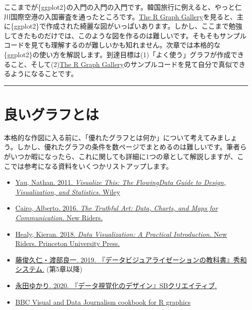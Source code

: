 \documentclass[
  a4paper,
  pandoc,
  ja=standard,
  jafont=haranoaji]{bxjsbook}
\providecommand{\tightlist}{%
  \setlength{\itemsep}{0pt}\setlength{\parskip}{0pt}}
\begin{document}
ここまでが\{ggplot2\}の入門の入門の入門です。韓国旅行に例えると、やっと仁川国際空港の入国審査を通ったところです。\href{https://www.r-graph-gallery.com/}{The
R Graph
Gallery}を見ると、主に\{ggplot2\}で作成された綺麗な図がいっぱいあります。しかし、ここまで勉強してきたものだけでは、このような図を作るのは難しいです。そもそもサンプルコードを見ても理解するのが難しいかも知れません。次章では本格的な\{ggplot2\}の使い方を解説します。到達目標は(1)「よく使う」グラフが作成できること、そして(2)\href{https://www.r-graph-gallery.com/}{The
R Graph
Gallery}のサンプルコードを見て自分で真似できるようになることです。

\begin{center}\rule{0.5\linewidth}{0.5pt}\end{center}

\hypertarget{sec-visual1_principal}{%
\section{良いグラフとは}\label{sec-visual1_principal}}

本格的な作図に入る前に、「優れたグラフとは何か」について考えてみましょう。しかし、優れたグラフの条件を数ページでまとめるのは難しいです。筆者らがいつか暇になったら、これに関しても詳細に1つの章として解説しますが、ここでは参考になる資料をいくつかリストアップします。

\begin{itemize}
\tightlist
\item
  \href{https://www.amazon.co.jp/dp/0470944889}{Yau, Nathan. 2011.
  \emph{Visualize This: The FlowingData Guide to Design, Visualization,
  and Statistics.} Wiley}
\item
  \href{https://www.amazon.co.jp/dp/0321934075}{Cairo, Alberto. 2016.
  \emph{The Truthful Art: Data, Charts, and Maps for Communication.} New
  Riders.}
\item
  \href{https://www.amazon.co.jp/dp/0691181624}{Healy, Kieran. 2018.
  \emph{Data Visualization: A Practical Introduction.} New Riders.
  Princeton University Press.}
\item
  \href{https://www.amazon.co.jp/dp/0691181624}{藤俊久仁・渡部良一.
  2019. 『データビジュアライゼーションの教科書』秀和システム.}
  (第5章以降)
\item
  \href{https://www.amazon.co.jp/dp/4815604053}{永田ゆかり. 2020.
  『データ視覚化のデザイン』SBクリエイティブ.}
\item
  \href{https://bbc.github.io/rcookbook/}{BBC Visual and Data Journalism
  cookbook for R graphics}
\end{itemize}
\end{document}
